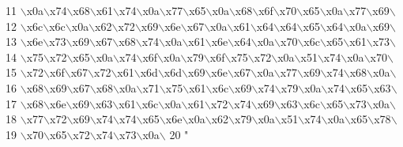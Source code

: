 \begin{DoxyCode}
11 \textcolor{stringliteral}{\(\backslash\)x0a\(\backslash\)x74\(\backslash\)x68\(\backslash\)x61\(\backslash\)x74\(\backslash\)x0a\(\backslash\)x77\(\backslash\)x65\(\backslash\)x0a\(\backslash\)x68\(\backslash\)x6f\(\backslash\)x70\(\backslash\)x65\(\backslash\)x0a\(\backslash\)x77\(\backslash\)x69\(\backslash\)}
12 \textcolor{stringliteral}{\(\backslash\)x6c\(\backslash\)x6c\(\backslash\)x0a\(\backslash\)x62\(\backslash\)x72\(\backslash\)x69\(\backslash\)x6e\(\backslash\)x67\(\backslash\)x0a\(\backslash\)x61\(\backslash\)x64\(\backslash\)x64\(\backslash\)x65\(\backslash\)x64\(\backslash\)x0a\(\backslash\)x69\(\backslash\)}
13 \textcolor{stringliteral}{\(\backslash\)x6e\(\backslash\)x73\(\backslash\)x69\(\backslash\)x67\(\backslash\)x68\(\backslash\)x74\(\backslash\)x0a\(\backslash\)x61\(\backslash\)x6e\(\backslash\)x64\(\backslash\)x0a\(\backslash\)x70\(\backslash\)x6c\(\backslash\)x65\(\backslash\)x61\(\backslash\)x73\(\backslash\)}
14 \textcolor{stringliteral}{\(\backslash\)x75\(\backslash\)x72\(\backslash\)x65\(\backslash\)x0a\(\backslash\)x74\(\backslash\)x6f\(\backslash\)x0a\(\backslash\)x79\(\backslash\)x6f\(\backslash\)x75\(\backslash\)x72\(\backslash\)x0a\(\backslash\)x51\(\backslash\)x74\(\backslash\)x0a\(\backslash\)x70\(\backslash\)}
15 \textcolor{stringliteral}{\(\backslash\)x72\(\backslash\)x6f\(\backslash\)x67\(\backslash\)x72\(\backslash\)x61\(\backslash\)x6d\(\backslash\)x6d\(\backslash\)x69\(\backslash\)x6e\(\backslash\)x67\(\backslash\)x0a\(\backslash\)x77\(\backslash\)x69\(\backslash\)x74\(\backslash\)x68\(\backslash\)x0a\(\backslash\)}
16 \textcolor{stringliteral}{\(\backslash\)x68\(\backslash\)x69\(\backslash\)x67\(\backslash\)x68\(\backslash\)x0a\(\backslash\)x71\(\backslash\)x75\(\backslash\)x61\(\backslash\)x6c\(\backslash\)x69\(\backslash\)x74\(\backslash\)x79\(\backslash\)x0a\(\backslash\)x74\(\backslash\)x65\(\backslash\)x63\(\backslash\)}
17 \textcolor{stringliteral}{\(\backslash\)x68\(\backslash\)x6e\(\backslash\)x69\(\backslash\)x63\(\backslash\)x61\(\backslash\)x6c\(\backslash\)x0a\(\backslash\)x61\(\backslash\)x72\(\backslash\)x74\(\backslash\)x69\(\backslash\)x63\(\backslash\)x6c\(\backslash\)x65\(\backslash\)x73\(\backslash\)x0a\(\backslash\)}
18 \textcolor{stringliteral}{\(\backslash\)x77\(\backslash\)x72\(\backslash\)x69\(\backslash\)x74\(\backslash\)x74\(\backslash\)x65\(\backslash\)x6e\(\backslash\)x0a\(\backslash\)x62\(\backslash\)x79\(\backslash\)x0a\(\backslash\)x51\(\backslash\)x74\(\backslash\)x0a\(\backslash\)x65\(\backslash\)x78\(\backslash\)}
19 \textcolor{stringliteral}{\(\backslash\)x70\(\backslash\)x65\(\backslash\)x72\(\backslash\)x74\(\backslash\)x73\(\backslash\)x0a\(\backslash\)}
20 \textcolor{stringliteral}{"}
\end{DoxyCode}
\hypertarget{namespacedraggabletext__rc3_ab06dad6dc8664eac17aee3a385fe69f4}{}
